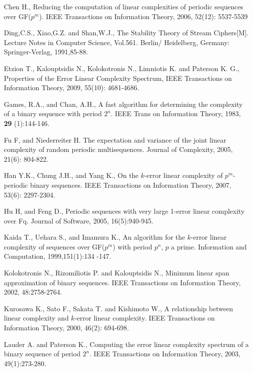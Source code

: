 \documentclass[10pt,conference,twocolumn]{IEEEtran}
\begin{document}
\begin{thebibliography}{3}

Chen H., Reducing the computation of linear complexities of periodic
sequences over GF($p^m$). IEEE Transactions on Information Theory,
2006, 52(12): 5537-5539


 Ding,C.S.,  Xiao,G.Z.  and Shan,W.J., The Stability Theory of Stream
Ciphers[M]. Lecture Notes in Computer Science, Vol.561. Berlin/
Heidelberg, Germany: Springer-Verlag, 1991,85-88.

Etzion T., Kalouptsidis N., Kolokotronis N., Limniotis K. and
Paterson K. G., Properties of the Error Linear Complexity Spectrum,
IEEE Transactions on Information Theory, 2009, 55(10): 4681-4686.

Games, R.A., and Chan, A.H., A fast algorithm for determining the
complexity of a binary sequence with period $2^n$. IEEE Trans on
Information Theory, 1983, {\bf29} (1):144-146.

Fu F, and Niederreiter H. The expectation and variance of the joint
linear complexity of random periodic multisequences. Journal of
Complexity, 2005, 21(6): 804-822.

Han Y.K., Chung J.H., and Yang K., On the $k$-error linear
complexity of $p^m$-periodic binary sequences. IEEE Transactions on
Information Theory, 2007, 53(6): 2297-2304.

Hu H, and Feng D., Periodic sequences with very large 1-error linear
complexity over Fq. Journal of Software, 2005, 16(5):940-945.

Kaida T., Uehara S., and Imamura K., An algorithm for the $k$-error
linear complexity of sequences over GF($p^m$) with period $p^n$, $p$
a prime. Information and Computation, 1999,151(1):134 -147.

Kolokotronis N., Rizomiliotis P. and Kalouptsidis N., Minimum linear
span approximation of binary sequences. IEEE Transactions on
Information Theory, 2002, 48:2758-2764.

Kurosawa K., Sato F., Sakata T. and Kishimoto W., A relationship
between linear complexity and $k$-error linear complexity. IEEE
Transactions on Information Theory, 2000, 46(2): 694-698.


Lauder A. and Paterson K., Computing the error linear complexity
spectrum of a binary sequence of period $2^n$. IEEE Transactions on
Information Theory, 2003, 49(1):273-280.



\end{thebibliography}
\end{document}
